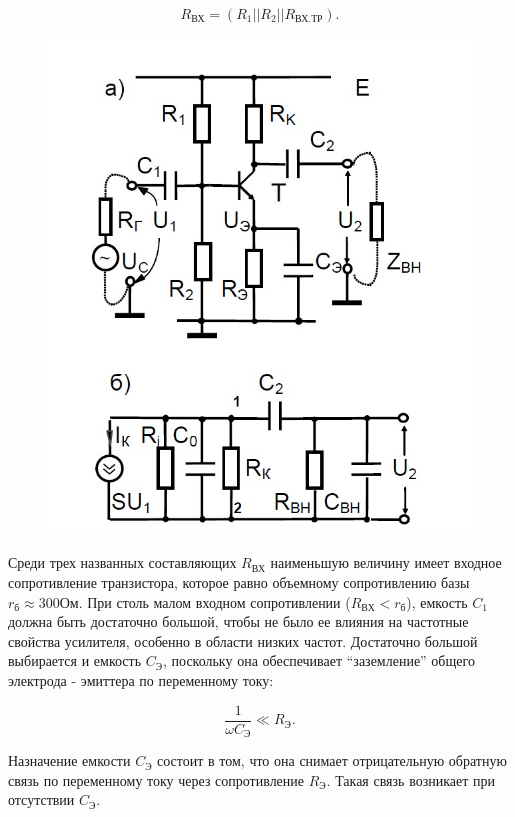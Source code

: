 $$R_{\text{ВХ}}=(R_1||R_2||R_{\text{ВХ.ТР}}).$$

\begin{figure}[h]
	\centering
	\includegraphics[width=0.6\linewidth]{fig/fig4}
	\caption{}
	\label{fig:4}
\end{figure}

Среди трех названных составляющих $R_{\text{ВХ}}$ наименьшую величину имеет входное сопротивление транзистора, которое равно объемному сопротивлению базы $r_{\text{б}}\approx 300\text{Ом}$. При столь малом входном сопротивлении ($R_{\text{ВХ}}<r_{\text{б}}$), емкость $C_1$ должна быть достаточно большой, чтобы не было ее влияния на частотные свойства усилителя, особенно в области низких частот. Достаточно большой выбирается и емкость $C_{\text{Э}}$, поскольку она обеспечивает “заземление” общего электрода - эмиттера по переменному току:

\begin{equation}
	\frac{1}{\omega C_{\text{Э}}}\ll R_{\text{Э}}.
	\label{eq:2}
\end{equation}

Назначение емкости $C_{\text{Э}}$ состоит в том, что она снимает отрицательную обратную связь по переменному току через сопротивление $R_{\text{Э}}$. Такая связь возникает при отсутствии $C_{\text{Э}}$.

